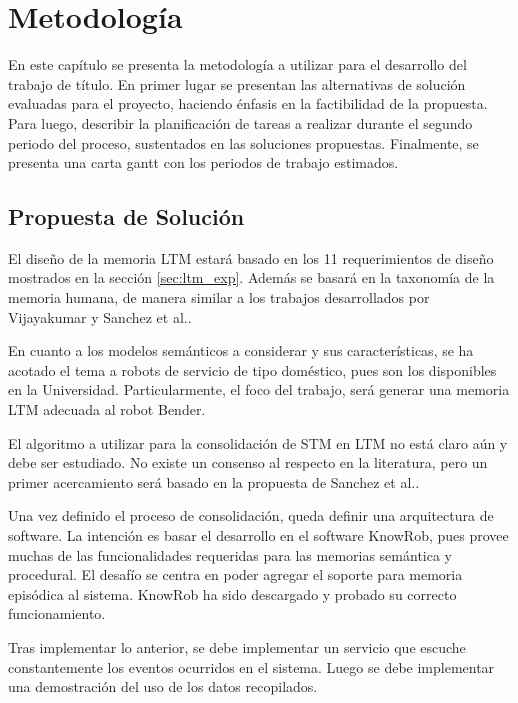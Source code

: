 
\chapter{Metodolog\'ia}

En este cap\'itulo se presenta la metodolog\'ia a utilizar para el desarrollo del trabajo de t\'itulo. En primer lugar se presentan las alternativas de soluci\'on evaluadas para el proyecto, haciendo \'enfasis en la factibilidad de la propuesta. Para luego, describir la planificaci\'on de tareas a realizar durante el segundo periodo del proceso, sustentados en las soluciones propuestas. Finalmente, se presenta una carta gantt con los periodos de trabajo estimados.


\section{Propuesta de Soluci\'on}

%


El dise\~no de la memoria LTM estar\'a basado en los 11 requerimientos de dise\~no mostrados en la secci\'on \ref{sec:ltm_exp}. Adem\'as se basar\'a en la taxonom\'ia de la memoria humana, de manera similar a los trabajos desarrollados por Vijayakumar\cite{Vijayakumar2014} y Sanchez et al.\cite{Sanchez:2015}.

En cuanto a los modelos sem\'anticos a considerar y sus caracter\'isticas, se ha acotado el tema a robots de servicio de tipo dom\'estico, pues son los disponibles en la Universidad. Particularmente, el foco del trabajo, ser\'a generar una memoria LTM adecuada al robot Bender.


El algoritmo a utilizar para la consolidaci\'on de STM en LTM no est\'a claro a\'un y debe ser estudiado. No existe un consenso al respecto en la literatura, pero un primer acercamiento ser\'a basado en la propuesta de Sanchez et al.\cite{Sanchez:2015}.


Una vez definido el proceso de consolidaci\'on, queda definir una arquitectura de software. La intenci\'on es basar el desarrollo en el software KnowRob, pues provee muchas de las funcionalidades requeridas para las memorias sem\'antica y procedural. El desaf\'io se centra en poder agregar el soporte para memoria epis\'odica al sistema. KnowRob ha sido descargado y probado su correcto funcionamiento.

Tras implementar lo anterior, se debe implementar un servicio que escuche constantemente los eventos ocurridos en el sistema. Luego se debe implementar una demostraci\'on del uso de los datos recopilados.

